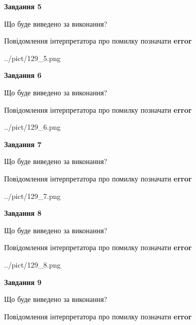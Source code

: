 \documentclass[11pt, ukrainian]{article}
\begin{document}
{\begin {large}
{\begin {center}\textbf{Завдання 5}\end {center}}\par
Що буде виведено за виконання? \par
Повідомлення інтерпретатора про помилку позначати \textbf{error}

\begin{center}
	{../pict/129_5.png}
\end{center}
\newpage

{\begin {center}\textbf{Завдання 6}\end {center}}\par
Що буде виведено за виконання? \par
Повідомлення інтерпретатора про помилку позначати \textbf{error}

\begin{center}
	{../pict/129_6.png}
\end{center}
\newpage

{\begin {center}\textbf{Завдання 7}\end {center}}\par
Що буде виведено за виконання? \par
Повідомлення інтерпретатора про помилку позначати \textbf{error}

\begin{center}
	{../pict/129_7.png}
\end{center}
\newpage

{\begin {center}\textbf{Завдання 8}\end {center}}\par
Що буде виведено за виконання? \par
Повідомлення інтерпретатора про помилку позначати \textbf{error}

\begin{center}
	{../pict/129_8.png}
\end{center}
\newpage

{\begin {center}\textbf{Завдання 9}\end {center}}\par
Що буде виведено за виконання? \par
Повідомлення інтерпретатора про помилку позначати \textbf{error}


\end{large}}
\end{document}
